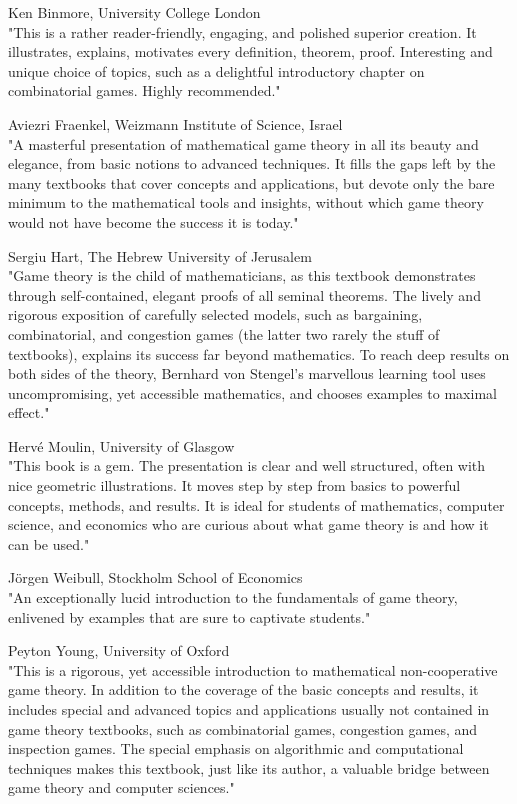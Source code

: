 \documentclass[12pt]{article}
\begin{document}
Ken Binmore, University College London\\
"This is a rather reader-friendly, engaging, and polished superior creation. It illustrates, explains, motivates every definition, theorem, proof. Interesting and unique choice of topics, such as a delightful introductory chapter on combinatorial games. Highly recommended."

Aviezri Fraenkel, Weizmann Institute of Science, Israel\\
"A masterful presentation of mathematical game theory in all its beauty and elegance, from basic notions to advanced techniques. It fills the gaps left by the many textbooks that cover concepts and applications, but devote only the bare minimum to the mathematical tools and insights, without which game theory would not have become the success it is today."

Sergiu Hart, The Hebrew University of Jerusalem\\
"Game theory is the child of mathematicians, as this textbook demonstrates through self-contained, elegant proofs of all seminal theorems. The lively and rigorous exposition of carefully selected models, such as bargaining, combinatorial, and congestion games (the latter two rarely the stuff of textbooks), explains its success far beyond mathematics. To reach deep results on both sides of the theory, Bernhard von Stengel's marvellous learning tool uses uncompromising, yet accessible mathematics, and chooses examples to maximal effect."

Hervé Moulin, University of Glasgow\\
"This book is a gem. The presentation is clear and well structured, often with nice geometric illustrations. It moves step by step from basics to powerful concepts, methods, and results. It is ideal for students of mathematics, computer science, and economics who are curious about what game theory is and how it can be used."

Jörgen Weibull, Stockholm School of Economics\\
"An exceptionally lucid introduction to the fundamentals of game theory, enlivened by examples that are sure to captivate students."

Peyton Young, University of Oxford\\
"This is a rigorous, yet accessible introduction to mathematical non-cooperative game theory. In addition to the coverage of the basic concepts and results, it includes special and advanced topics and applications usually not contained in game theory textbooks, such as combinatorial games, congestion games, and inspection games. The special emphasis on algorithmic and computational techniques makes this textbook, just like its author, a valuable bridge between game theory and computer sciences."
\end{document}
